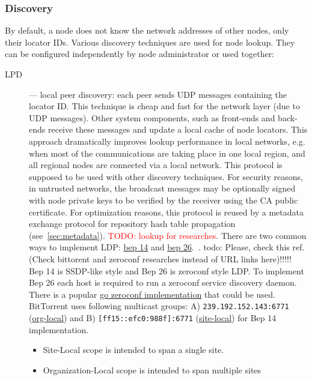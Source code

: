 \documentclass[acmlarge, screen, nonacm, 11pt]{acmart}
\newcommand{\code}[1]{\texttt{#1}}
\newcommand{\todo}[1]{\textcolor{red}{TODO: #1}}
\begin{document}
\subsubsection{Discovery}\label{sec:discovery}

By default, a node does not know the network addresses of other nodes,
only their locator IDs.
Various discovery techniques are used for node lookup.
They can be configured independently by node
administrator or used together:

\begin{description}
  \item[LPD] --- local peer discovery: each peer sends UDP messages containing the locator ID.
    This technique is cheap and fast for the network layer (due to UDP messages). Other system components,
    such as front-ends and back-ends receive these messages and update a local cache of node locators.
    This approach dramatically improves lookup performance in local networks, e.g. when most of the communications
    are taking place in one local region, and all regional nodes are connected via a local network.
    This protocol is supposed to be used with other discovery techniques.
    For security reasons, in untrusted networks, the broadcast messages may be optionally signed with
    node private keys to be verified by the receiver using the CA public certificate.
    For optimization reasons, this protocol is reused by a metadata exchange protocol for
    repository hash table propagation (see~\ref{sec:metadata}). \todo{lookup for researches}.
    There are two common ways to implement LDP: \href{http://bittorrent.org/beps/bep_0014.html}{bep 14} and \href{http://bittorrent.org/beps/bep_0026.html}{bep 26}.~\cite{bittorrent}. todo:  Please, check this ref. (Check bittorent and zeroconf researches instead of URL links here)!!!!!
    Bep 14 is SSDP-like style and Bep 26 is zeroconf style LDP. To implement Bep 26 each host is required to run a zeroconf service discovery daemon.
    There is a popular \href{https://github.com/grandcat/zeroconf}{go zeroconf implementation} that could be used.
    BitTorrent uses following multicast groups: A) \code{239.192.152.143:6771} (\href{https://tools.ietf.org/html/rfc2365#section-6.2}{org-local}) and B) \code{[ff15::efc0:988f]:6771} (\href{https://tools.ietf.org/html/rfc4291#section-2.5.7}{site-local}) for Bep 14 implementation.
    \begin{itemize}
      \item Site-Local scope is intended to span a single site.
      \item Organization-Local scope is intended to span multiple sites

\end{itemize}
\end{description}
\end{document}
